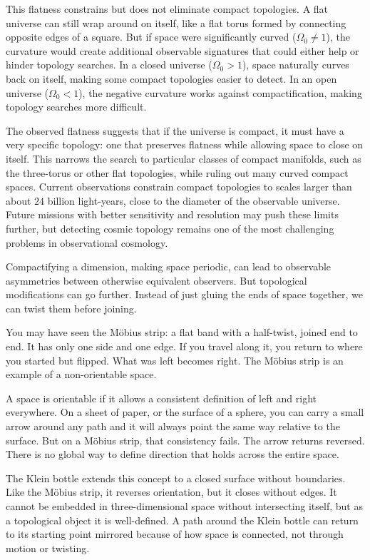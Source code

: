 This flatness constrains but does not eliminate compact topologies. A flat universe can still wrap around on itself, like a flat torus formed by connecting opposite edges of a square. But if space were significantly curved ($\Omega_0 \neq 1$), the curvature would create additional observable signatures that could either help or hinder topology searches. In a closed universe ($\Omega_0 > 1$), space naturally curves back on itself, making some compact topologies easier to detect. In an open universe ($\Omega_0 < 1$), the negative curvature works against compactification, making topology searches more difficult.

The observed flatness suggests that if the universe is compact, it must have a very specific topology: one that preserves flatness while allowing space to close on itself. This narrows the search to particular classes of compact manifolds, such as the three-torus or other flat topologies, while ruling out many curved compact spaces. Current observations constrain compact topologies to scales larger than about $24$ billion light-years, close to the diameter of the observable universe. Future missions with better sensitivity and resolution may push these limits further, but detecting cosmic topology remains one of the most challenging problems in observational cosmology.

Compactifying a dimension, making space periodic, can lead to observable asymmetries between otherwise equivalent observers. But topological modifications can go further. Instead of just gluing the ends of space together, we can twist them before joining.

You may have seen the Möbius strip: a flat band with a half-twist, joined end to end. It has only one side and one edge. If you travel along it, you return to where you started but flipped. What was left becomes right. The Möbius strip is an example of a non-orientable space.

A space is orientable if it allows a consistent definition of left and right everywhere. On a sheet of paper, or the surface of a sphere, you can carry a small arrow around any path and it will always point the same way relative to the surface. But on a Möbius strip, that consistency fails. The arrow returns reversed. There is no global way to define direction that holds across the entire space.

The Klein bottle extends this concept to a closed surface without boundaries. Like the Möbius strip, it reverses orientation, but it closes without edges. It cannot be embedded in three-dimensional space without intersecting itself, but as a topological object it is well-defined. A path around the Klein bottle can return to its starting point mirrored because of how space is connected, not through motion or twisting.

